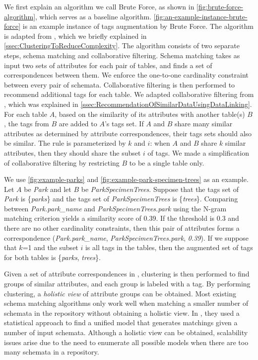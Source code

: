 We first explain an algorithm we call Brute Force, as shown in \autoref{fig:brute-force-algorithm}, which serves as a baseline algorithm. \autoref{fig:an-example-instance-brute-force} is an example instance of tags augmentation by Brute Force. The algorithm is adapted from \cite{Smith2011Unity}, which we briefly explained in \autoref{ssec:ClusteringToReduceComplexity}. The algorithm consists of two separate steps, schema matching and collaborative filtering. Schema matching takes as input two sets of attributes for each pair of tables, and finds a set of correspondences between them. We enforce the one-to-one cardinality constraint between every pair of schemata. Collaborative filtering is then performed to recommend additional tags for each table. We adapted collaborative filtering from \cite{conf/esws/EllefiBDT16}, which was explained in \autoref{ssec:RecommendationOfSimilarDataUsingDataLinking}. For each table $A$, based on the similarity of its attributes with another table(s) $B$, the tags from $B$ are added to $A$'s tags set. If $A$ and $B$ share many similar attributes as determined by attribute correspondences, their tags sets should also be similar. The rule is parameterized by $k$ and $i$: when $A$ and $B$ share $k$ similar attributes, then they should share the subset $i$ of tags. We made a simplification of collaborative filtering by restricting $B$ to be a single table only.

We use \autoref{fig:example-parks} and \autoref{fig:example-park-specimen-trees} as an example. Let $A$ be \textit{Park} and let $B$ be \textit{ParkSpecimenTrees}. Suppose that the tags set of \textit{Park} is \{\textit{parks}\} and the tags set of \textit{ParkSpecimenTrees} is \{\textit{trees}\}. Comparing between \textit{Park.park\_name} and \textit{ParkSpecimenTrees.park} using the N-gram matching criterion yields a similarity score of 0.39. If the threshold is 0.3 and there are no other cardinality constraints, then this pair of attributes forms a correspondence (\textit{Park.park\_name}, \textit{ParkSpecimenTrees.park}, \textit{0.39}). If we suppose that $k$=1 and the subset $i$ is all tags in the tables, then the augmented set of tags for both tables is \{\textit{parks}, \textit{trees}\}.

Given a set of attribute correspondences in \cite{Smith2011Unity}, clustering is then performed to find groups of similar attributes, and each group is labeled with a tag. By performing clustering, a \textit{holistic view} of attribute groups can be obtained. Most existing schema matching algorithms only work well when matching a smaller number of schemata in the repository without obtaining a holistic view. In \cite{10.1145/2396761.2398468}, they used a statistical approach to find a unified model that generates matchings given a number of input schemata. Although a holistic view can be obtained, scalability issues arise due to the need to enumerate all possible models when there are too many schemata in a repository.

